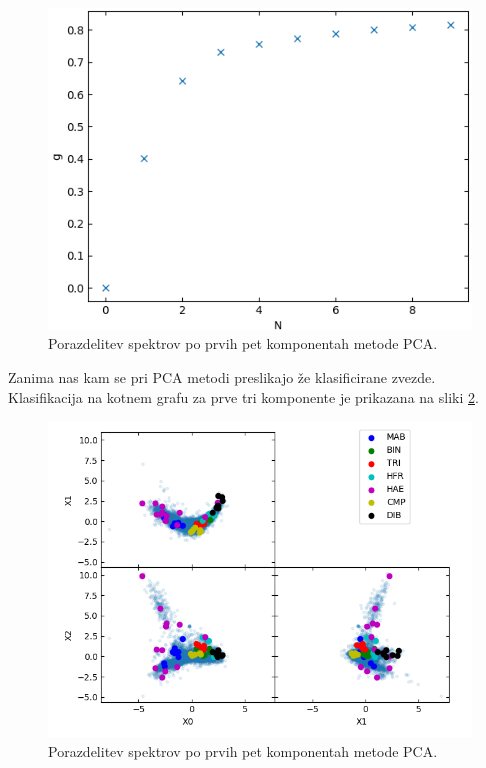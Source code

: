 \documentclass[11pt,a4paper]{article}
\begin{document}
\begin{figure}[h]
    \centering
    \hbox{\hspace{9em}\includegraphics[scale=0.65]{energija}}
    \caption{Porazdelitev spektrov po prvih pet komponentah metode PCA.}
    \label{3}
\end{figure}

Zanima nas kam se pri PCA metodi preslikajo že klasificirane zvezde. Klasifikacija na kotnem grafu za prve tri komponente je prikazana na sliki \ref{4}.

\begin{figure}[h]
    \centering
    \hbox{\hspace{6em}\includegraphics[scale=0.7]{PCA_klasifikacija}}
    \caption{Porazdelitev spektrov po prvih pet komponentah metode PCA.}
    \label{4}
\end{figure}
\end{document}
